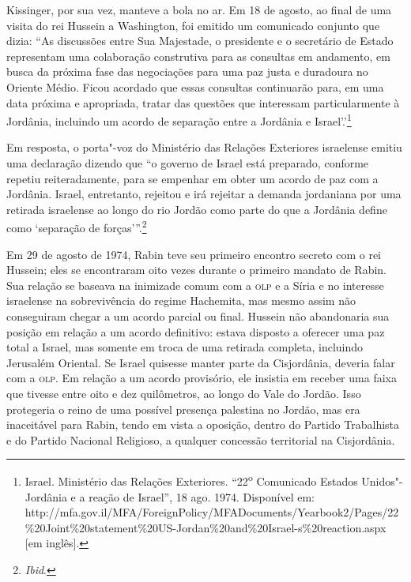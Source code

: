 Kissinger, por sua vez, manteve a bola no ar. Em 18 de agosto, ao final
de uma visita do rei Hussein a Washington, foi emitido um comunicado
conjunto que dizia: ``As discussões entre Sua Majestade, o presidente e
o secretário de Estado representam uma colaboração construtiva para as
consultas em andamento, em busca da próxima fase das negociações para
uma paz justa e duradoura no Oriente Médio. Ficou acordado que essas
consultas continuarão para, em uma data próxima e apropriada, tratar das
questões que interessam particularmente à Jordânia, incluindo um acordo
de separação entre a Jordânia e Israel'.'\footnote{Israel. Ministério das Relações Exteriores. 
``22\textsuperscript{o} Comunicado Estados Unidos"-Jordânia e a reação de Israel'', 18 ago. 1974. Disponível em: http://mfa.gov.il/MFA/ForeignPolicy/MFADocuments/Yearbook2/Pages/22\%20Joint\%20statement\%20US-Jordan\%20and\%20Israel-s\%20reaction.aspx
{[}em inglês{]}.}

Em resposta, o porta"-voz do Ministério das Relações Exteriores israelense
emitiu uma declaração dizendo que ``o governo de Israel está preparado,
conforme repetiu reiteradamente, para se empenhar em obter um acordo de
paz com a Jordânia. Israel, entretanto, rejeitou e irá rejeitar a
demanda jordaniana por uma retirada israelense ao longo do rio Jordão
como parte do que a Jordânia define como `separação de
forças'''.\footnote{\emph{Ibid}.}

Em 29 de agosto de 1974, Rabin teve seu primeiro encontro secreto com o
rei Hussein; eles se encontraram oito vezes durante o primeiro mandato
de Rabin. Sua relação se baseava na inimizade comum com a \textsc{olp} e a Síria
e no interesse israelense na sobrevivência do regime Hachemita, mas
mesmo assim não conseguiram chegar a um acordo parcial ou final. Hussein
não abandonaria sua posição em relação a um acordo definitivo: estava
disposto a oferecer uma paz total a Israel, mas somente em troca de uma
retirada completa, incluindo Jerusalém Oriental. Se Israel quisesse
manter parte da Cisjordânia, deveria falar com a \textsc{olp}. Em relação a um
acordo provisório, ele insistia em receber uma faixa que tivesse entre
oito e dez quilômetros, ao longo do Vale do Jordão. Isso protegeria o
reino de uma possível presença palestina no Jordão, mas era inaceitável
para Rabin, tendo em vista a oposição, dentro do Partido Trabalhista e
do Partido Nacional Religioso, a qualquer concessão territorial na
Cisjordânia.

